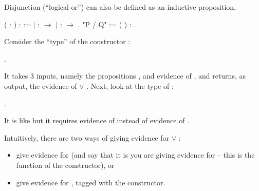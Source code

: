 \documentclass[12pt]{report}
\begin{document}
 Disjunction (``logical or'') can also be defined as an
    inductive proposition. \begin{coqdoccode}
\coqdocemptyline
\coqdocnoindent
{}  (  : ) :  :=\coqdoceol
\coqdocindent{1.00em}
\ensuremath{|}  :  \ensuremath{\rightarrow}   \coqdoceol
\coqdocindent{1.00em}
\ensuremath{|}  :  \ensuremath{\rightarrow}   .\coqdoceol
\coqdocemptyline
\coqdocnoindent
{} "P / Q" := (  ) : .\coqdoceol
\coqdocemptyline
\end{coqdoccode}
Consider the ``type'' of the constructor : \begin{coqdoccode}
\coqdocemptyline
\coqdocnoindent
{} .\coqdoceol
\coqdocemptyline
\end{coqdoccode}
It takes 3 inputs, namely the propositions ,  and
    evidence of , and returns, as output, the evidence of  \ensuremath{\lor} .
    Next, look at the type of : \begin{coqdoccode}
\coqdocemptyline
\coqdocnoindent
{} .\coqdoceol
\coqdocemptyline
\end{coqdoccode}
It is like  but it requires evidence of 
    instead of evidence of . 

 Intuitively, there are two ways of giving evidence for  \ensuremath{\lor} :



\begin{itemize}
\item  give evidence for  (and say that it is  you are giving
      evidence for -- this is the function of the 
      constructor), or



\item  give evidence for , tagged with the 
      constructor. 
\end{itemize}


\subsubsection{ }
\end{document}
